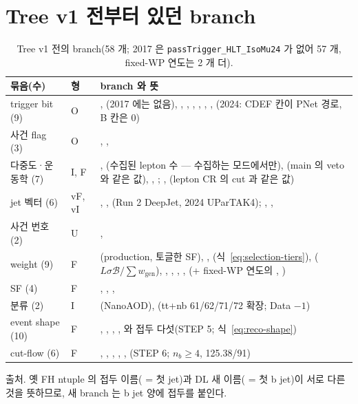 \section{Tree v1 전부터 있던 branch}\label{sec:treev1-old}

\begin{table}[htbp]\centering
\caption{Tree v1 전의 branch(58 개; 2017 은 \texttt{passTrigger\_HLT\_IsoMu24} 가 없어 57 개, fixed-WP 연도는 2 개 더).}\label{tab:treev1-old}
\small
\begin{tabularx}{\linewidth}{@{}>{\raggedright\arraybackslash}p{2.6cm}>{\centering\arraybackslash}p{0.7cm}L@{}}
\toprule
묶음(수) & 형 & branch 와 뜻 \\
\midrule
trigger bit (9) & O & , (2017 에는 없음), ,
, , , , , (2024: CDEF 칸이 PNet 경로, B 칸은 0) \\
사건 flag (3) & O & , ,  \\
다중도·운동학 (7) & I, F & , (수집된 lepton 수 — 수집하는 모드에서만), (main 의 veto 와 같은 값), , ;
, (lepton CR 의 cut 과 같은 값) \\
jet 벡터 (6) & vF, vI & , , (Run 2 DeepJet, 2024 UParTAK4); , ,  \\
사건 번호 (2) & U & ,  \\
weight (9) & F & (production, 토글한 SF), , (식~\eqref{eq:selection-tiers}),
($L\sigma\mathcal{B}/\sum w_{\text{gen}}$), , , , , 
(+ fixed-WP 연도의 , ) \\
SF (4) & F & , , ,  \\
\ttbar{} 분류 (2) & I & (NanoAOD), (tt+nb 61/62/71/72 확장; Data $-1$) \\
event shape (10) & F & , , , ,  와  접두 다섯(STEP 5; 식~\eqref{eq:reco-shape}) \\
cut-flow \chisq{} (6) & F & , , , , , (STEP 6; $n_b\ge4$, 125.38/91) \\
\bottomrule
\end{tabularx}
\end{table}
출처. 옛 FH ntuple 의  접두 이름( = 첫 jet)과 DL 새 이름( = 첫 b jet)이
서로 다른 것을 뜻하므로, 새 branch 는 b jet 양에  접두를 붙인다.

